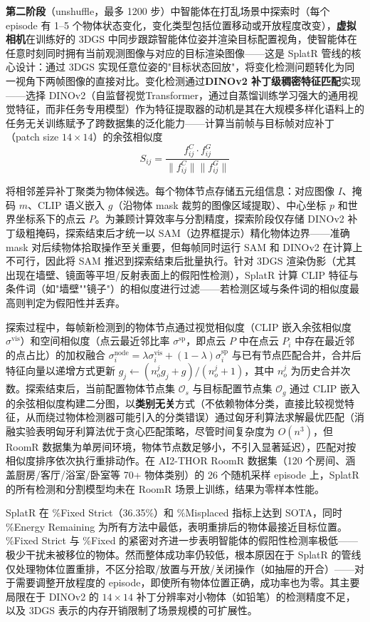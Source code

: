 \textbf{第二阶段}（unshuffle，最多 1200 步）中智能体在打乱场景中探索时（每个 episode 有 1--5 个物体状态变化，变化类型包括位置移动或开放程度改变），\textbf{虚拟相机}在训练好的 3DGS 中同步跟踪智能体位姿并渲染目标配置视角，使智能体在任意时刻同时拥有当前观测图像与对应的目标渲染图像——这是 SplatR 管线的核心设计：通过 3DGS 实现任意位姿的"目标状态回放"，将变化检测问题转化为同一视角下两帧图像的直接对比。变化检测通过\textbf{DINOv2 补丁级稠密特征匹配}实现——选择 DINOv2（自监督视觉Transformer，通过自蒸馏训练学习强大的通用视觉特征，而非任务专用模型）作为特征提取器的动机是其在大规模多样化语料上的任务无关训练赋予了跨数据集的泛化能力——计算当前帧与目标帧对应补丁（patch size $14\times14$）的余弦相似度
\begin{equation}
S_{ij} = \frac{f_{ij}^C \cdot f_{ij}^G}{\|f_{ij}^C\| \|f_{ij}^G\|}
\end{equation}

将相邻差异补丁聚类为物体候选。每个物体节点存储五元组信息：对应图像 $I$、掩码 $m$、CLIP 语义嵌入 $g$（沿物体 mask 裁剪的图像区域提取）、中心坐标 $p$ 和世界坐标系下的点云 $P$。为兼顾计算效率与分割精度，探索阶段仅存储 DINOv2 补丁级粗掩码，探索结束后才统一以 SAM（边界框提示）精化物体边界——准确 mask 对后续物体拾取操作至关重要，但每帧同时运行 SAM 和 DINOv2 在计算上不可行，因此将 SAM 推迟到探索结束后批量执行。针对 3DGS 渲染伪影（尤其出现在墙壁、镜面等平坦/反射表面上的假阳性检测），SplatR 计算 CLIP 特征与条件词（如"墙壁""镜子"）的相似度进行过滤——若检测区域与条件词的相似度最高则判定为假阳性并丢弃。

探索过程中，每帧新检测到的物体节点通过视觉相似度（CLIP 嵌入余弦相似度 $\sigma^{\text{vis}}$）和空间相似度（点云最近邻比率 $\sigma^{\text{sp}}$，即点云 $P$ 中在点云 $P_i$ 中存在最近邻的点占比）的加权融合 $\sigma_i^{\text{node}} = \lambda \sigma_i^{\text{vis}} + (1-\lambda)\sigma_i^{\text{sp}}$ 与已有节点匹配合并，合并后特征向量以递增方式更新 $g_j \leftarrow (n_o^j g_j + g)/(n_o^j + 1)$，其中 $n_o^j$ 为历史合并次数。探索结束后，当前配置物体节点集 $\mathcal{O}_s$ 与目标配置节点集 $\mathcal{O}_g$ 通过 CLIP 嵌入的余弦相似度构建二分图，以\textbf{类别无关}方式（不依赖物体分类，直接比较视觉特征，从而绕过物体检测器可能引入的分类错误）通过匈牙利算法求解最优匹配（消融实验表明匈牙利算法优于贪心匹配策略，尽管时间复杂度为 $O(n^3)$，但 RoomR 数据集为单房间环境，物体节点数足够小，不引入显著延迟），匹配对按相似度排序依次执行重排动作。在 AI2-THOR RoomR 数据集（120 个房间、涵盖厨房/客厅/浴室/卧室等 70+ 物体类别）的 26 个随机采样 episode 上，SplatR 的所有检测和分割模型均未在 RoomR 场景上训练，结果为零样本性能。

SplatR 在 \%Fixed Strict（36.35\%）和 \%Misplaced 指标上达到 SOTA，同时 \%Energy Remaining 为所有方法中最低，表明重排后的物体最接近目标位置。\%Fixed Strict 与 \%Fixed 的紧密对齐进一步表明智能体的假阳性检测率极低——极少干扰未被移位的物体。然而整体成功率仍较低，根本原因在于 SplatR 的管线仅处理物体位置重排，不区分拾取/放置与开放/关闭操作（如抽屉的开合）——对于需要调整开放程度的 episode，即使所有物体位置正确，成功率也为零。其主要局限在于 DINOv2 的 $14\times14$ 补丁分辨率对小物体（如铅笔）的检测精度不足，以及 3DGS 表示的内存开销限制了场景规模的可扩展性。

